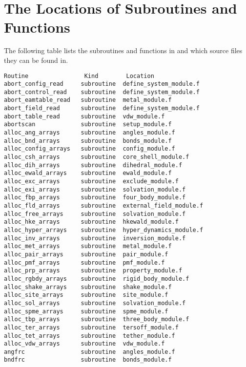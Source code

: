 \section*{The Locations of Subroutines and Functions}

The following table lists the subroutines and functions in \D{} and
which source files they can be found in.

\begin{verbatim}
Routine                Kind        Location
abort_config_read     subroutine  define_system_module.f    
abort_control_read    subroutine  define_system_module.f    
abort_eamtable_read   subroutine  metal_module.f            
abort_field_read      subroutine  define_system_module.f    
abort_table_read      subroutine  vdw_module.f              
abortscan             subroutine  setup_module.f            
alloc_ang_arrays      subroutine  angles_module.f           
alloc_bnd_arrays      subroutine  bonds_module.f            
alloc_config_arrays   subroutine  config_module.f           
alloc_csh_arrays      subroutine  core_shell_module.f       
alloc_dih_arrays      subroutine  dihedral_module.f         
alloc_ewald_arrays    subroutine  ewald_module.f            
alloc_exc_arrays      subroutine  exclude_module.f          
alloc_exi_arrays      subroutine  solvation_module.f        
alloc_fbp_arrays      subroutine  four_body_module.f        
alloc_fld_arrays      subroutine  external_field_module.f   
alloc_free_arrays     subroutine  solvation_module.f        
alloc_hke_arrays      subroutine  hkewald_module.f          
alloc_hyper_arrays    subroutine  hyper_dynamics_module.f   
alloc_inv_arrays      subroutine  inversion_module.f        
alloc_met_arrays      subroutine  metal_module.f            
alloc_pair_arrays     subroutine  pair_module.f             
alloc_pmf_arrays      subroutine  pmf_module.f              
alloc_prp_arrays      subroutine  property_module.f         
alloc_rgbdy_arrays    subroutine  rigid_body_module.f       
alloc_shake_arrays    subroutine  shake_module.f            
alloc_site_arrays     subroutine  site_module.f             
alloc_sol_arrays      subroutine  solvation_module.f        
alloc_spme_arrays     subroutine  spme_module.f             
alloc_tbp_arrays      subroutine  three_body_module.f       
alloc_ter_arrays      subroutine  tersoff_module.f          
alloc_tet_arrays      subroutine  tether_module.f           
alloc_vdw_arrays      subroutine  vdw_module.f              
angfrc                subroutine  angles_module.f           
bndfrc                subroutine  bonds_module.f            

\end{verbatim}

